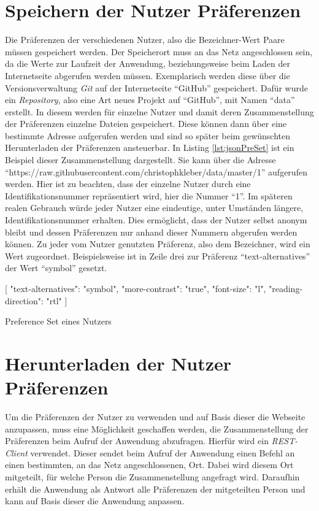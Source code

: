 \documentclass[12pt, paper=a4, bibtotoc, toc=listof, headsepline=true, numbers=endperiod]{scrreprt}
\begin{document}
\section{Speichern der Nutzer Präferenzen}
Die Präferenzen der verschiedenen Nutzer, also die Bezeichner-Wert Paare müssen gespeichert werden. Der Speicherort muss an das Netz angeschlossen sein, da die Werte zur Laufzeit der Anwendung, beziehungsweise beim Laden der Internetseite abgerufen werden müssen. Exemplarisch werden diese über die Versionsverwaltung \emph{Git} auf der Internetseite \enquote{GitHub} gespeichert. Dafür wurde ein \emph{Repository}, also eine Art neues Projekt auf \enquote{GitHub}, mit Namen \enquote{data} erstellt. In diesem werden für einzelne Nutzer und damit deren Zusammenstellung der Präferenzen einzelne  Dateien gespeichert. Diese können dann über eine bestimmte Adresse aufgerufen werden und sind so später beim gewünschten Herunterladen der Präferenzen ansteuerbar. In Listing \ref{lst:jsonPreSet} ist ein Beispiel dieser Zusammenstellung dargestellt. Sie kann über
\newline
die Adresse \enquote{https://raw.githubusercontent.com/christophkleber/data/master/1} aufgerufen werden. Hier ist zu beachten, dass der einzelne Nutzer durch eine Identifikationsnummer repräsentiert wird, hier die Nummer \enquote{1}. Im späteren realen Gebrauch würde jeder Nutzer eine eindeutige, unter Umständen längere, Identifikationsnummer erhalten. Dies ermöglicht, dass der Nutzer selbst anonym bleibt und dessen Präferenzen nur anhand dieser Nummern abgerufen werden können. Zu jeder vom Nutzer genutzten Präferenz, also dem Bezeichner, wird ein Wert zugeordnet. Beispielsweise ist in Zeile drei zur Präferenz \enquote{text-alternatives} der Wert \enquote{symbol} gesetzt. 
\begin{listing}
	\begin{JavaScriptcode*}{}
[
   {
      "text-alternatives": "symbol",
      "more-contrast": "true",
      "font-size": "l",
      "reading-direction": "rtl"
   }
]
	\end{JavaScriptcode*}
	\caption[Beispiel eines Preference Sets]{Preference Set eines Nutzers}
	\label{lst:jsonPreSet}
\end{listing}

\section{Herunterladen der Nutzer Präferenzen}
Um die Präferenzen der Nutzer zu verwenden und auf Basis dieser die Webseite anzupassen, muss eine Möglichkeit geschaffen werden, die Zusammenstellung der Präferenzen beim Aufruf der Anwendung abzufragen. Hierfür wird ein \emph{REST-Client} verwendet. Dieser sendet beim Aufruf der Anwendung einen Befehl an einen bestimmten, an das Netz angeschlossenen, Ort. Dabei wird diesem Ort mitgeteilt, für welche Person die Zusammenstellung angefragt wird. Daraufhin erhält die Anwendung als Antwort alle Präferenzen der mitgeteilten Person und kann auf Basis dieser die Anwendung anpassen.
\end{document}
